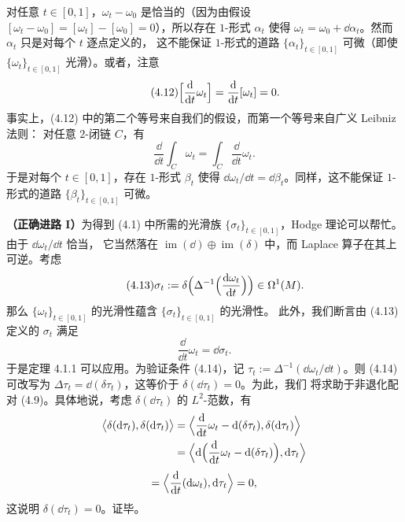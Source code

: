 \begin{wproof}
  对任意 $t\in[0,1]$，$\omega_t-\omega_0$ 是恰当的（因为由假设
  $[\omega_t-\omega_0]=[\omega_t]-[\omega_0]=0$），所以存在 $1$-形式 $\alpha_t$
  使得 $\omega_t=\omega_0+\dd\alpha_t$。然而 $\alpha_t$ 只是对每个 $t$ 逐点定义的，
  这不能保证 $1$-形式的道路 $\{\alpha_t\}_{t\in[0,1]}$ 可微（即使
  $\{\omega_t\}_{t\in[0,1]}$ 光滑）。或者，注意
  \begin{equation}\tag{4.12}
    \Bigl[\frac{\mathrm{d}}{\mathrm{d} t}\omega_t\Bigr]=\frac{\mathrm{d}}{\mathrm{d} t}[\omega_t]=0.
  \end{equation}
  事实上，(4.12) 中的第二个等号来自我们的假设，而第一个等号来自广义 Leibniz 法则：
  对任意 $2$-闭链 $C$，有
  \begin{equation*}
    \frac{\dd}{\dd t}\int_C\omega_t=\int_C\frac{\dd}{\dd t}\omega_t.
  \end{equation*}
  于是对每个 $t\in[0,1]$，存在 $1$-形式 $\beta_t$ 使得
  $\dd\omega_t/\dd t=\dd\beta_t$。同样，这不能保证 $1$-形式的道路
  $\{\beta_t\}_{t\in[0,1]}$ 可微。

  \textbf{（正确进路 I）}为得到 (4.1) 中所需的光滑族
  $\{\sigma_t\}_{t\in[0,1]}$，Hodge 理论可以帮忙。由于 $\dd\omega_t/\dd t$ 恰当，
  它当然落在 $\operatorname{im}(\dd)\oplus\operatorname{im}(\delta)$ 中，而 Laplace
  算子在其上可逆。考虑
  \begin{equation}\tag{4.13}
    \sigma_t:=\delta\Bigl(\Delta^{-1}\Bigl(\frac{\mathrm{d}\omega_t}{\mathrm{d} t}\Bigr)\Bigr)
    \in\Omega^1(M).
  \end{equation}
  那么 $\{\omega_t\}_{t\in[0,1]}$ 的光滑性蕴含 $\{\sigma_t\}_{t\in[0,1]}$ 的光滑性。
  此外，我们断言由 (4.13) 定义的 $\sigma_t$ 满足
  \begin{equation}\tag{4.14}
    \frac{\dd}{\dd t}\omega_t=\dd\sigma_t.
  \end{equation}
  于是定理 4.1.1 可以应用。为验证条件 (4.14)，记
  $\tau_t:=\Delta^{-1}(\dd\omega_t/\dd t)$。则 (4.14) 可改写为
  $\Delta\tau_t=\dd(\delta\tau_t)$，这等价于 $\delta(\dd\tau_t)=0$。为此，我们
  将求助于非退化配对 (4.9)。具体地说，考虑 $\delta(\dd\tau_t)$ 的 $L^2$-范数，有
  \begin{equation*}
    \begin{aligned}
      \bigl\langle\delta(\mathrm{d}\tau_t),\delta(\mathrm{d}\tau_t)\bigr\rangle
      &=\Bigl\langle\frac{\mathrm{d}}{\mathrm{d} t}\omega_t-\mathrm{d}(\delta\tau_t),
      \delta(\mathrm{d}\tau_t)\Bigr\rangle\\
      &=\Bigl\langle\mathrm{d}\Bigl(\frac{\mathrm{d}}{\mathrm{d} t}\omega_t-\mathrm{d}(\delta\tau_t)\Bigr),
      \mathrm{d}\tau_t\Bigr\rangle
    \end{aligned}
  \end{equation*}
  \begin{equation*}
    =\Bigl\langle\frac{\mathrm{d}}{\mathrm{d} t}(\mathrm{d}\omega_t),\mathrm{d}\tau_t\Bigr\rangle=0,
  \end{equation*}
  这说明 $\delta(\dd\tau_t)=0$。证毕。


\end{wproof}
